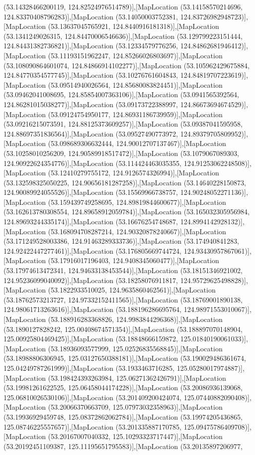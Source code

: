 (53.14328466200119, 124.82524976514789)],[MapLocation (53.14158570214696, 124.83370408796283)],[MapLocation (53.14050003752381, 124.83726982948723)],[MapLocation (53.13637045765921, 124.8440916181318)],[MapLocation (53.1341249026315, 124.84470006546636)],[MapLocation (53.129799223151444, 124.84431382736821)],[MapLocation (53.12334579776256, 124.84862681946412)],[MapLocation (53.11193151962247, 124.85266026803697)],[MapLocation (53.108090864601074, 124.84866914102277)],[MapLocation (53.105962429675884, 124.84770354577745)],[MapLocation (53.10276761604843, 124.84819707223619)],[MapLocation (53.09514940026564, 124.85680083824451)],[MapLocation (53.09462041008695, 124.85854007363106)],[MapLocation (53.0941565392564, 124.86281015038277)],[MapLocation (53.09173722388997, 124.86673694674529)],[MapLocation (53.09124754950177, 124.86931186739959)],[MapLocation (53.09216215073591, 124.88125373609257)],[MapLocation (53.09387041595958, 124.88697351836564)],[MapLocation (53.09527490773972, 124.89379705809952)],[MapLocation (53.098689306632444, 124.90012707137467)],[MapLocation (53.10258010256209, 124.90589918517472)],[MapLocation (53.1079067089303, 124.90922624354776)],[MapLocation (53.114424463035355, 124.91253062248508)],[MapLocation (53.12410279755172, 124.9126574326994)],[MapLocation (53.132598325050225, 124.90656181287258)],[MapLocation (53.14640228150873, 124.90089924055526)],[MapLocation (53.15569966738757, 124.90248052271136)],[MapLocation (53.159439749258695, 124.89819844600677)],[MapLocation (53.162613780308554, 124.89658912059784)],[MapLocation (53.165032305956984, 124.89693244335174)],[MapLocation (53.16676254748687, 124.8994142928132)],[MapLocation (53.168094708287214, 124.90320878240667)],[MapLocation (53.171249528003386, 124.91463289333736)],[MapLocation (53.174940841283, 124.92422447277461)],[MapLocation (53.176805669744724, 124.93430957867061)],[MapLocation (53.17916017196403, 124.9408345060477)],[MapLocation (53.17974613472341, 124.94633138453544)],[MapLocation (53.18151346921002, 124.95236099040092)],[MapLocation (53.18258076911817, 124.95729625498828)],[MapLocation (53.1822933510025, 124.9635860462561)],[MapLocation (53.18762573213727, 124.97332152411565)],[MapLocation (53.18769001890138, 124.98061713263616)],[MapLocation (53.188196286695764, 124.98971553010067)],[MapLocation (53.188916283368826, 124.9983844296368)],[MapLocation (53.1890127828242, 125.00408674571354)],[MapLocation (53.188897070148904, 125.00925804469425)],[MapLocation (53.18848666159872, 125.01840190061033)],[MapLocation (53.18936093577999, 125.02526835568845)],[MapLocation (53.18988806306945, 125.03127650388181)],[MapLocation (53.190029486361674, 125.04249787261999)],[MapLocation (53.1933463716285, 125.05280017974887)],[MapLocation (53.198424393263984, 125.06271362426791)],[MapLocation (53.19981261622525, 125.06458044174228)],[MapLocation (53.20086936139068, 125.06810026530106)],[MapLocation (53.201409200424074, 125.07440882090408)],[MapLocation (53.20066370663709, 125.07973032358963)],[MapLocation (53.19936929459748, 125.08372862062784)],[MapLocation (53.19974205436865, 125.08746225557657)],[MapLocation (53.201335887170785, 125.09475786409708)],[MapLocation (53.20167007040332, 125.10293323717447)],[MapLocation (53.20192451109387, 125.11195651795583)],[MapLocation (53.20135897206977, 